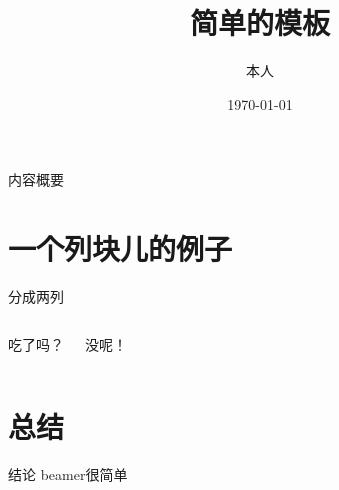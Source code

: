 \documentclass[compress]{beamer}
\title{简单的模板}
\author{本人}
\institute{家里蹲大学}
\date{\today}
\begin{document}
\frame{\titlepage}

\begin{frame}{内容概要}
\tableofcontents[hideallsubsections]
\end{frame}

\section{一个列块儿的例子}
\begin{frame}{分成两列}

\begin{columns}

吃了吗？

没呢！
\end{columns}
\end{frame}


\section{总结}
\begin{frame}{结论}
beamer很简单
\end{frame}
\end{document}
